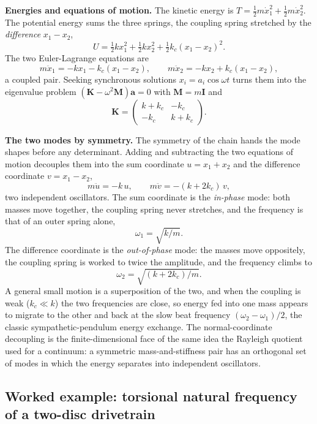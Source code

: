 

\textbf{Energies and equations of motion.} The kinetic energy is
$T = \tfrac12 m\dot x_1^2 + \tfrac12 m\dot x_2^2$. The potential energy sums
the three springs, the coupling spring stretched by the \emph{difference}
$x_1 - x_2$,
\[
U = \tfrac12 k x_1^2 + \tfrac12 k x_2^2 + \tfrac12 k_c(x_1 - x_2)^2.
\]
The two Euler-Lagrange equations are
\[
m\ddot x_1 = -k x_1 - k_c(x_1 - x_2),
\qquad
m\ddot x_2 = -k x_2 + k_c(x_1 - x_2),
\]
a coupled pair. Seeking synchronous solutions $x_i = a_i\cos\omega t$ turns
them into the eigenvalue problem $(\mathbf{K} - \omega^2\mathbf{M})\mathbf{a}
= 0$ with $\mathbf{M} = m\mathbf{I}$ and
\[
\mathbf{K} = \begin{pmatrix} k + k_c & -k_c \\ -k_c & k + k_c \end{pmatrix}.
\]

\textbf{The two modes by symmetry.} The symmetry of the chain hands the mode
shapes before any determinant. Adding and subtracting the two equations of
motion decouples them into the sum coordinate $u = x_1 + x_2$ and the
difference coordinate $v = x_1 - x_2$,
\[
m\ddot u = -k\,u,
\qquad
m\ddot v = -(k + 2k_c)\,v,
\]
two independent oscillators. The sum coordinate is the \emph{in-phase} mode:
both masses move together, the coupling spring never stretches, and the
frequency is that of an outer spring alone,
\[
\omega_1 = \sqrt{k/m}.
\]
The difference coordinate is the \emph{out-of-phase} mode: the masses move
oppositely, the coupling spring is worked to twice the amplitude, and the
frequency climbs to
\[
\omega_2 = \sqrt{(k + 2k_c)/m}.
\]
A general small motion is a superposition of the two, and when the coupling is
weak ($k_c\ll k$) the two frequencies are close, so energy fed into one mass
appears to migrate to the other and back at the slow beat frequency
$(\omega_2 - \omega_1)/2$, the classic sympathetic-pendulum energy exchange.
The normal-coordinate decoupling is the finite-dimensional face of the same
idea the Rayleigh quotient used for a continuum: a symmetric mass-and-stiffness
pair has an orthogonal set of modes in which the energy separates into
independent oscillators.

\subsection{Worked example: torsional natural frequency of a two-disc
drivetrain}

